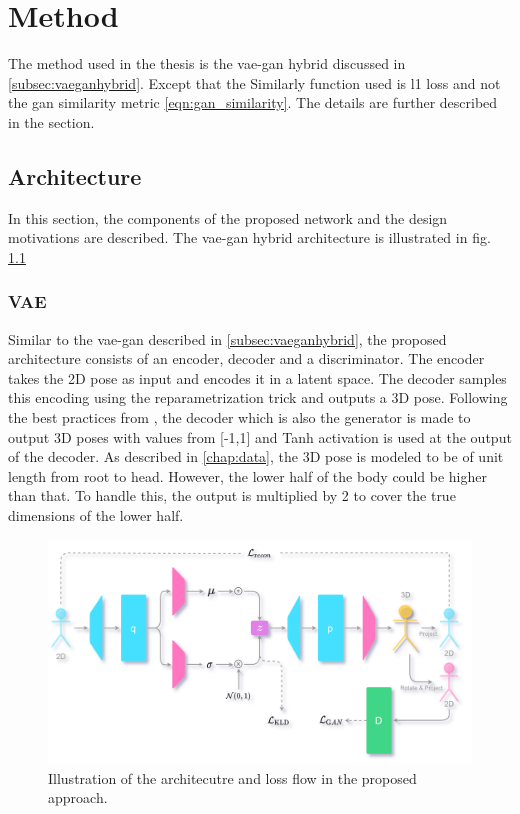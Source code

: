\chapter{Method}

The method used in the thesis is the \ac{vae}-\ac{gan} hybrid discussed in \ref{subsec:vaeganhybrid}. Except that the Similarly function used is \ac{l1} loss and not the \ac{gan} similarity metric \ref{eqn:gan_similarity}. The details are further described in the section.

\section{Architecture}

In this section, the components of the proposed network and the design motivations are described. The \ac{vae}-\ac{gan} hybrid architecture is illustrated in fig. \ref{fig:method_arch}

\subsection{VAE} 
Similar to the \ac{vae}-\ac{gan} described in \ref{subsec:vaeganhybrid}, the proposed architecture consists of an encoder, decoder and a discriminator. The encoder takes the 2D pose as input and encodes it in a latent space. The decoder samples this encoding using the reparametrization trick and outputs a 3D pose. Following the best practices from \cite{soumith2017wasserstein}, the decoder which is also the generator is made to output 3D poses with values from [-1,1] and Tanh activation is used at the output of the decoder. As described in \ref{chap:data}, the 3D pose is modeled to be of unit length from root to head. However, the lower half of the body could be higher than that. To handle this, the output is multiplied by 2 to cover the true dimensions of the lower half.

\begin{figure}[!h]
    \centering
    \includegraphics[scale=0.2]{figures/arch/method_arch.png}
    \caption{Illustration of the architecutre and loss flow in the proposed approach. }
    \label{fig:method_arch}
\end{figure}


